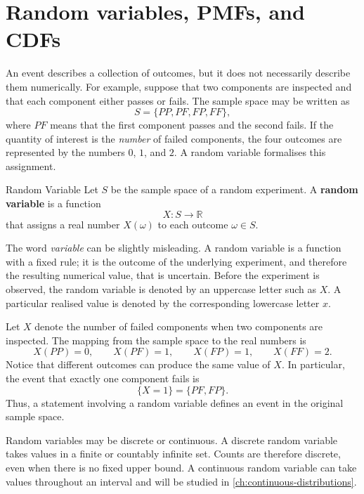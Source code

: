 \section{Random variables, PMFs, and CDFs}
\label{sec:random-variables-pmf-cdf}

An event describes a collection of outcomes, but it does not necessarily describe them numerically. For example, suppose that two components are inspected and that each component either passes or fails. The sample space may be written as
\[
S=\{PP,PF,FP,FF\},
\]
where $PF$ means that the first component passes and the second fails. If the quantity of interest is the \emph{number} of failed components, the four outcomes are represented by the numbers $0$, $1$, and $2$. A random variable formalises this assignment.

\begin{definition}{Random Variable}
    Let $S$ be the sample space of a random experiment. A \textbf{random variable} is a function
    \[
    X:S\longrightarrow \mathbb{R}
    \]
    that assigns a real number $X(\omega)$ to each outcome $\omega\in S$.
\end{definition}

The word \emph{variable} can be slightly misleading. A random variable is a function with a fixed rule; it is the outcome of the underlying experiment, and therefore the resulting numerical value, that is uncertain. Before the experiment is observed, the random variable is denoted by an uppercase letter such as $X$. A particular realised value is denoted by the corresponding lowercase letter $x$.

\begin{example}\par
Let $X$ denote the number of failed components when two components are inspected. The mapping from the sample space to the real numbers is
\[
X(PP)=0,\qquad X(PF)=1,\qquad X(FP)=1,\qquad X(FF)=2.
\]
Notice that different outcomes can produce the same value of $X$. In particular, the event that exactly one component fails is
\[
\{X=1\}=\{PF,FP\}.
\]
Thus, a statement involving a random variable defines an event in the original sample space.
\end{example}

Random variables may be discrete or continuous. A discrete random variable takes values in a finite or countably infinite set. Counts are therefore discrete, even when there is no fixed upper bound. A continuous random variable can take values throughout an interval and will be studied in \autoref{ch:continuous-distributions}.

